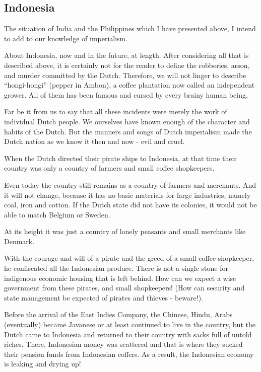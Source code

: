 \subsection{Indonesia}

The situation of India and the Philippines which I have presented above, 
I intend to add to our knowledge of imperialism.\nline

About Indonesia, now and in the future, at length. After considering all 
that is described above, it is certainly not for the reader to define the 
robberies, arson, and murder committed by the Dutch. Therefore, we will not 
linger to describe “hongi-hongi” (pepper in Ambon), a coffee plantation now 
called an independent grower. All of them has been famous and cursed by every brainy human being.\nline

Far be it from us to say that all these incidents were merely the work of 
individual Dutch people. We ourselves have known enough of the character and 
habits of the Dutch. But the manners and songs of Dutch imperialism made the 
Dutch nation as we know it then and now - evil and cruel.\nline

When the Dutch directed their pirate ships to Indonesia, at that time their 
country was only a country of farmers and small coffee shopkeepers.\nline

Even today the country still remains as a country of farmers and merchants. 
And it will not change, because it has no basic materials for large industries, 
namely coal, iron and cotton. If the Dutch state did not have its colonies, 
it would not be able to match Belgium or Sweden.\nline

At its height it was just a country of lonely peasants and small merchants like Denmark.\nline

With the courage and will of a pirate and the greed of a small coffee shopkeeper, 
he confiscated all the Indonesian produce. There is not a single stone for indigenous 
economic housing that is left behind. How can we expect a wise government from these 
pirates, and small shopkeepers! (How can security and state management be expected of pirates and thieves - beware!).\nline

Before the arrival of the East Indies Company, the Chinese, Hindu, Arabs (eventually) 
became Javanese or at least continued to live in the country, but the Dutch came to 
Indonesia and returned to their country with sacks full of untold riches. There, 
Indonesian money was scattered and that is where they sucked their pension funds 
from Indonesian coffers. As a result, the Indonesian economy is leaking and drying up!\nline


